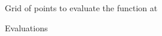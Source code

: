 \documentclass[
    xcolor={svgnames,dvipsnames},
    hyperref={colorlinks, citecolor=DeepPink4, linkcolor=DarkRed, urlcolor=DarkBlue}
    ]{beamer}  %
\newcommand{\1}{\mathbbm 1}
\begin{document}
\begin{frame}
    
    \begin{figure}
       \begin{center}
           \caption{Grid of points to evaluate the function at}
       \end{center}
    \end{figure}

\end{frame}

\begin{frame}
    
    \begin{figure}
       \begin{center}
           \caption{Evaluations}
       \end{center}
    \end{figure}

\end{frame}
\end{document}

